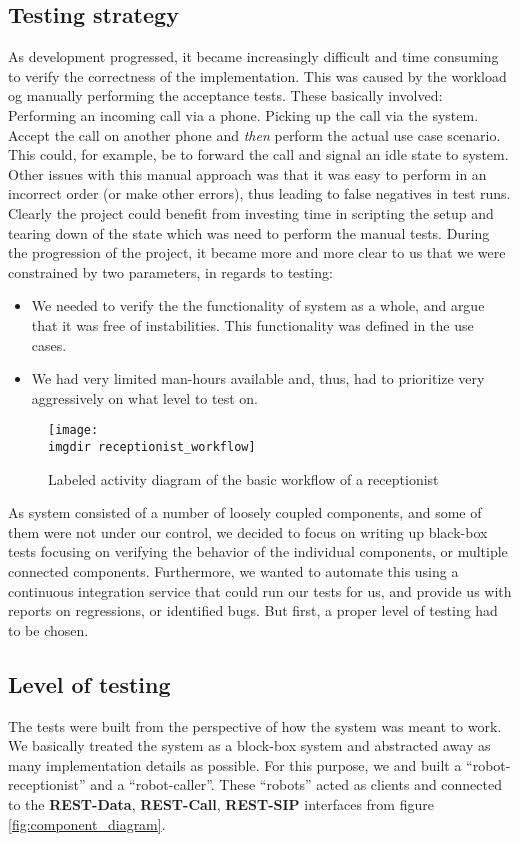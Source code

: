 \subsection{Testing strategy}
\label{sec:background-testing-strategy}
As development progressed, it became increasingly difficult and time consuming to verify the correctness of the implementation. This was caused by the workload og manually performing the acceptance tests. These basically involved: Performing an incoming call via a phone. Picking up the call via the system. Accept the call on another phone and \emph{then} perform the actual use case scenario. This could, for example, be to forward the call and signal an idle state to system. Other issues with this manual approach was that it was easy to perform in an incorrect order (or make other errors), thus leading to false negatives in test runs. Clearly the project could benefit from investing time in scripting the setup and tearing down of the state which was need to perform the manual tests.
During the progression of the project, it became more and more clear to us that we were constrained by two parameters, in regards to testing:
\begin{itemize}
  \item We needed to verify the the functionality of system as a whole, and argue that it was free of instabilities. This functionality was defined in the use cases.
  \item We had very limited man-hours available and, thus, had to prioritize very aggressively on what level to test on.
\end{itemize}
\begin{figure}[ht]
\centering
\texttt{[image: \\imgdir receptionist\_workflow]}
\caption{Labeled activity diagram of the basic workflow of a receptionist}
\label{fig:receptionist-workflow}
\end{figure}
As system consisted of a number of loosely coupled components, and some of them were not under our control, we decided to focus on writing up black-box tests focusing on verifying the behavior of the individual components, or multiple connected components.
Furthermore, we wanted to automate this using a continuous integration service that could run our tests for us, and provide us with reports on regressions, or identified bugs. But first, a proper level of testing had to be chosen.

\subsection{Level of testing}
\label{ssec:level-of-testing}
The tests were built from the perspective of how the system was meant to work. We basically treated the system as a block-box system and abstracted away as many implementation details as possible. For this purpose, we and built a ``robot-receptionist'' and a ``robot-caller''. These ``robots'' acted as clients and connected to the \textbf{REST-Data}, \textbf{REST-Call}, \textbf{REST-SIP} interfaces from figure \ref{fig:component_diagram}.

